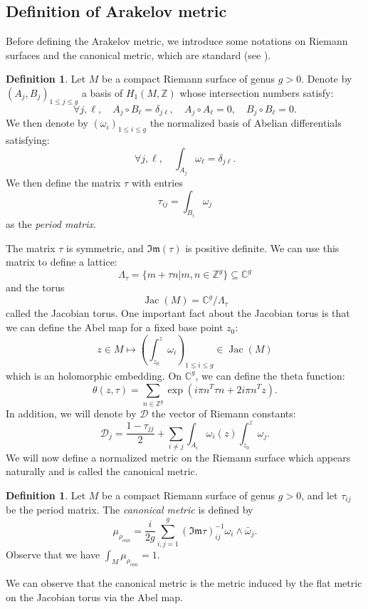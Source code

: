 \documentclass{article}
\theoremstyle{definition}
\newtheorem{Definition}[theorem]{Definition}
\theoremstyle{remark}
\DeclareMathOperator{\Jac}{Jac}
\begin{document}
\subsection{Definition of Arakelov metric}
Before defining the Arakelov metric, we introduce some notations on Riemann surfaces and the canonical metric, which are standard (see \cite{DHokerPhongFunctionMandelstamDiag,KlevtsovGenus,WentworthArakelov}).
\begin{Definition}
    Let $M$ be a compact Riemann surface of genus $g>0$. Denote by $(A_j, B_j)_{1 \leq j \leq g}$ a basis of $H_1(M, \mathbb{Z})$ whose intersection numbers satisfy:
    \[ \forall j,\ell, \quad
    A_j \circ B_\ell = \delta_{j\ell}, \quad A_j \circ A_\ell = 0, \quad B_j \circ B_\ell = 0.
    \]
    We then denote by $(\omega_i)_{1 \leq i \leq g}$ the normalized basis of Abelian differentials satisfying:
    \[ \forall j,\ell, \quad
    \int_{A_j} \omega_\ell = \delta_{j\ell}.
    \]
    We then define the matrix $\tau$ with entries
    \[
    \tau_{ij} = \int_{B_i} \omega_j
    \]
    as the \emph{period matrix}.
\end{Definition}

    The matrix $\tau$ is symmetric, and $\mathfrak{Im}(\tau)$ is positive definite.
We can use this matrix to define a lattice: 
$$\Lambda_{\tau}=\{m+\tau n | m,n \in \mathbb{Z}^{g}\}\subseteq \mathbb{C}^{g}$$ and the torus $$\Jac(M)=\mathbb{C}^{g}/\Lambda_{\tau}$$ called the Jacobian torus. 
One important fact about the Jacobian torus is that we can define the Abel map for a fixed base point $z_{0}$: $$z \in M \mapsto \left(\int_{z_{0}}^{z} \omega_{i} \right)_{1\leq i\leq g}\in \Jac(M) $$ which is an holomorphic embedding. On $\mathbb{C}^{g}$, we can define the theta function: 
$$\theta(z,\tau)=\sum_{n\in \mathbb{Z}^{g}}\exp\left(i\pi n^{T}\tau n+2i\pi n^{T}z \right).$$
In addition, we will denote by $\mathcal{D}$ the vector of Riemann constants: $$\mathcal{D}_{j}=\frac{1-\tau_{jj}}{2}+\sum_{i\neq j}\int_{A_{i}}\omega_{i}(z)\int_{z_{0}}^{z}\omega_{j}.$$
We will now define a normalized metric on the Riemann surface which appears naturally and is called the canonical metric.
\begin{Definition}\label{Def:MétCan}
    Let $M$ be a compact Riemann surface of genus $g>0$, and let $\tau_{ij}$ be the period matrix. The \emph{canonical metric} is defined by
    \[
    \mu_{\rho_{can}} = \frac{i}{2g} \sum_{i,j=1}^{g} (\mathfrak{Im} \tau)_{ij}^{-1} \omega_i \wedge \bar{\omega}_j.
    \]
    Observe that we have $\int_M \mu_{\rho_{can}} = 1$.
\end{Definition}
We can observe that the canonical metric is the metric induced by the flat metric on the Jacobian torus via the Abel map.
\end{document}
